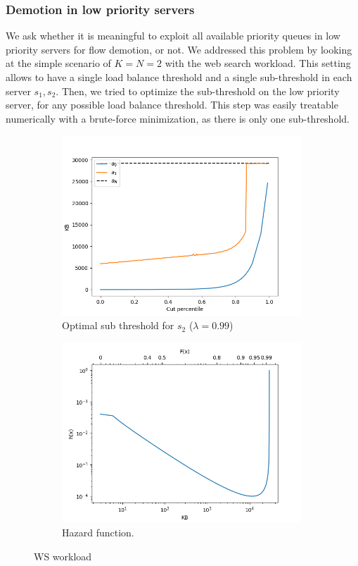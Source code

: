 \subsubsection{Demotion in low priority servers}
We ask whether it is meaningful to exploit all available priority queues in low priority servers for flow demotion, or not. We addressed this problem by looking at the simple scenario of $K=N=2$ with the web search workload. This setting allows to have a single load balance threshold and a single sub-threshold in each server $s_1,s_2$. Then, we tried to optimize the sub-threshold on the low priority server, for any possible load balance threshold. This step was easily treatable numerically with a brute-force minimization, as there is only one sub-threshold.
\begin{figure}
	\centering
	\begin{subfigure}{.5\textwidth}
		\centering
		\includegraphics[width=0.99\textwidth]{Chapter3/Figures/cut_demotion}
		\caption{Optimal sub threshold for $s_2$ ($\lambda=0.99$)}
		\label{fig:opt-subth-lowpserver}
	\end{subfigure}%
	\hfill
	\begin{subfigure}{.5\textwidth}
		\centering
		\includegraphics[width=0.99\textwidth]{Chapter3/Figures/hazard_pareto}
		\caption{Hazard function.}
		\label{fig:hazard}
	\end{subfigure}%
	\caption{WS workload}
\end{figure}%
